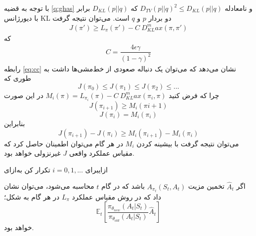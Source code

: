 با توجه به قضیه \ref{q:ghas} و نامعادله $D_{TV}(p || q)^2 \le D_{KL}(p || q)$  که  $D_{KL} (p || q)$ برابر با دیورژانس KL دو بردار $p$ و $q$ است\cite{schulman2015trust}. می‌توان  نتیجه گرفت
\begin{align*}
J(\pi') \ge L_{\pi}(\pi') - C \ D_{KL}^max(\pi, \pi')
\end{align*}
که
\begin{align}
C = \dfrac{4 \epsilon \gamma}{(1-\gamma)^2}
\label{eq:cc}
\end{align}
رابطه \ref{eq:cc} نشان می‌دهد که می‌توان یک دنباله صعودی از خط‌مشی‌ها داشت به طوری که
$$J(\pi_0) \le J(\pi_1) \le J(\pi_2) \le ... $$
چرا که فرض کنید
$M_i(\pi) = L_{\pi_i}(\pi) - C \ D_{KL}^max(\pi_i, \pi)$
در این صورت $$J(\pi_{i+1}) \ge M_i(\pi{i+1}) $$ 
$$J(\pi_i) = M_i(\pi_i)$$
بنابراین
$$J(\pi_{i+1}) - J(\pi_i) \ge M_i(\pi_{i+1}) - M_i(\pi_i)$$
می‌توان نتیجه گرفت با بیشینه کردن $M_i$ در هر گام می‌توان اطمینان حاصل کرد که مقیاس عملکرد واقعی $J$ غیرنزولی خواهد بود.


‌ازای{برای 
	$i=0,1,...$
	 تکرار کن}
‌به‌ازای

اگر $\hat{A}_t$ تخمین مزیت 
$A_{\pi_t}(S_t, A_t)$
باشد که در گام $t$ محاسبه می‌شود، می‌توان نشان داد که در روش
  مقیاس عملکرد $L_\pi$ در هر گام به شکل؛
$$\mathbb{E}_t\left[\dfrac{\pi_{\theta_{new}}(A_t| S_t)}{\pi_{\theta_{old}}(A_t|S_t)} \hat{A}_t \right]$$خواهد بود.
